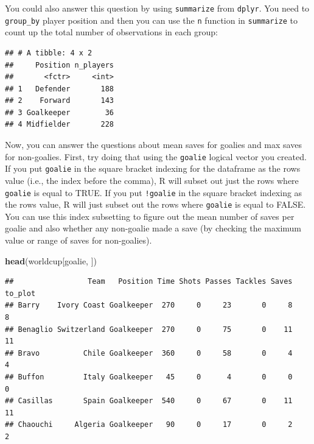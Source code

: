 \documentclass[]{book}
\makeatletter
\newenvironment{Shaded}{\begin{snugshade}}{\end{snugshade}}
\newcommand{\KeywordTok}[1]{\textcolor[rgb]{0.13,0.29,0.53}{\textbf{#1}}}
\newcommand{\DataTypeTok}[1]{\textcolor[rgb]{0.13,0.29,0.53}{#1}}
\newcommand{\StringTok}[1]{\textcolor[rgb]{0.31,0.60,0.02}{#1}}
\newcommand{\OperatorTok}[1]{\textcolor[rgb]{0.81,0.36,0.00}{\textbf{#1}}}
\newcommand{\NormalTok}[1]{#1}
\newenvironment{kframe}{%
\medskip{}
\setlength{\fboxsep}{.8em}
 \def\at@end@of@kframe{}%
 \ifinner\ifhmode%
  \def\at@end@of@kframe{\end{minipage}}%
  \begin{minipage}{\columnwidth}%
 \fi\fi%
 \def\FrameCommand##1{\hskip\@totalleftmargin \hskip-\fboxsep
 \colorbox{shadecolor}{##1}\hskip-\fboxsep
     \hskip-\linewidth \hskip-\@totalleftmargin \hskip\columnwidth}%
 \MakeFramed {\advance\hsize-\width
   \@totalleftmargin\z@ \linewidth\hsize
   \@setminipage}}%
 {\par\unskip\endMakeFramed%
 \at@end@of@kframe}
\renewenvironment{Shaded}{\begin{kframe}}{\end{kframe}}
\theoremstyle{definition}
\theoremstyle{definition}
\theoremstyle{definition}
\theoremstyle{remark}
\makeatother
\begin{document}
You could also answer this question by using \texttt{summarize} from
\texttt{dplyr}. You need to \texttt{group\_by} player position and then
you can use the \texttt{n} function in \texttt{summarize} to count up
the total number of observations in each group:

\begin{Shaded}
\end{Shaded}

\begin{verbatim}
## # A tibble: 4 x 2
##     Position n_players
##       <fctr>     <int>
## 1   Defender       188
## 2    Forward       143
## 3 Goalkeeper        36
## 4 Midfielder       228
\end{verbatim}

Now, you can answer the questions about mean saves for goalies and max
saves for non-goalies. First, try doing that using the \texttt{goalie}
logical vector you created. If you put \texttt{goalie} in the square
bracket indexing for the dataframe as the rows value (i.e., the index
before the comma), R will subset out just the rows where \texttt{goalie}
is equal to TRUE. If you put \texttt{!goalie} in the square bracket
indexing as the rows value, R will just subset out the rows where
\texttt{goalie} is equal to FALSE. You can use this index subsetting to
figure out the mean number of saves per goalie and also whether any
non-goalie made a save (by checking the maximum value or range of saves
for non-goalies).

\begin{Shaded}
\begin{Highlighting}[]
\KeywordTok{head}\NormalTok{(worldcup[goalie, ])}
\end{Highlighting}
\end{Shaded}

\begin{verbatim}
##                 Team   Position Time Shots Passes Tackles Saves to_plot
## Barry    Ivory Coast Goalkeeper  270     0     23       0     8       8
## Benaglio Switzerland Goalkeeper  270     0     75       0    11      11
## Bravo          Chile Goalkeeper  360     0     58       0     4       4
## Buffon         Italy Goalkeeper   45     0      4       0     0       0
## Casillas       Spain Goalkeeper  540     0     67       0    11      11
## Chaouchi     Algeria Goalkeeper   90     0     17       0     2       2
\end{verbatim}
\end{document}
